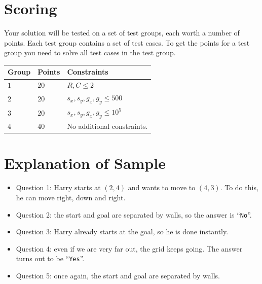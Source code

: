 \section*{Scoring}
Your solution will be tested on a set of test groups, each worth a number of points. Each test group contains
a set of test cases. To get the points for a test group you need to solve all test cases in the test group.

\noindent
\begin{tabular}{| l | l | p{12cm} |}
  \hline
  \textbf{Group} & \textbf{Points} & \textbf{Constraints} \\ \hline
  $1$    & $20$  & $R, C \leq 2$ \\ \hline
  $2$    & $20$  & $s_x, s_y, g_x, g_y \leq 500$ \\ \hline
  $3$    & $20$  & $s_x, s_y, g_x, g_y \leq 10^5$ \\ \hline
  $4$    & $40$  & No additional constraints. \\ \hline
\end{tabular}

\section*{Explanation of Sample}
\begin{itemize}
  \item Question 1: Harry starts at $(2,4)$ and wants to move to $(4,3)$.
  To do this, he can move right, down and right.
  \item Question 2: the start and goal are separated by walls, so the answer is ``\texttt{No}''.
  \item Question 3: Harry already starts at the goal, so he is done instantly.
  \item Question 4: even if we are very far out, the grid keeps going. The answer turns out to be ``\texttt{Yes}''.
  \item Question 5: once again, the start and goal are separated by walls.
\end{itemize}

